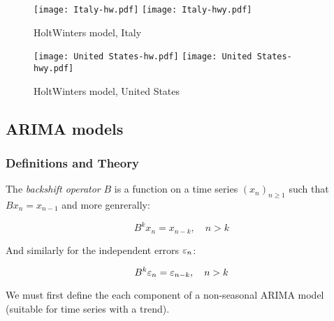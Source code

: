 \begin{figure}[H]
  \texttt{[image: Italy-hw.pdf]} \label{fig:italy-hw}
\endminipage\hfill
{}
  \texttt{[image: Italy-hwy.pdf]} \label{fig:italy-hwy}
\endminipage
\caption{HoltWinters model, Italy}
\end{figure}

\begin{figure}[H]
  \texttt{[image: United States-hw.pdf]} \label{fig:usa-hw}
\endminipage\hfill
{}
  \texttt{[image: United States-hwy.pdf]} \label{fig:usa-hwy}
\endminipage
\caption{HoltWinters model, United States}
\end{figure}


\subsection{ARIMA models}

\subsubsection{Definitions and Theory}

\begin{definition}
The \textit{backshift operator} $B$ is a function on a time series $\left(x_n\right)_{n\geq1}$ such that $Bx_n=x_{n-1}$ and more genrerally:

$$B^k x_n= x_{n-k},\quad n>k$$

And similarly for the independent errors $\varepsilon_n$:

$$B^k \varepsilon_n= \varepsilon_{n-k},\quad n>k$$
\end{definition}

We must first define the each component of a non-seasonal ARIMA model (suitable for time series with a trend).

